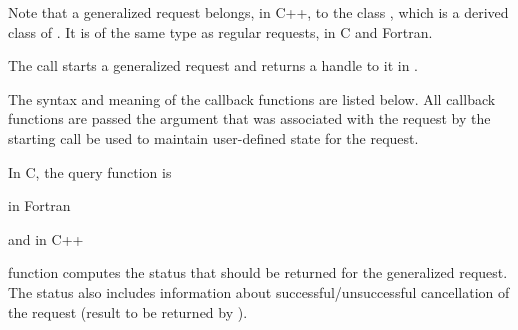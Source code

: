 %

\begin{users}
Note that a generalized request belongs, in C++, to the class
, which is a derived class of .
It is of the same type as regular requests, in C and Fortran.
\end{users}

The call starts a generalized request and returns a handle to it in
.

The syntax and meaning of the callback functions are listed below.
All callback functions are passed the  argument
that was associated with the request by the starting call
 be used to maintain user-defined
state for the request.  

In 
C, the query function is
\medskip

%

\par\noindent
in Fortran

\medskip


\par\noindent
and in C++

\medskip


 function computes the status
that should be returned for the generalized request.
The status
also includes information about successful/unsuccessful cancellation of
the request (result to be returned by ).

